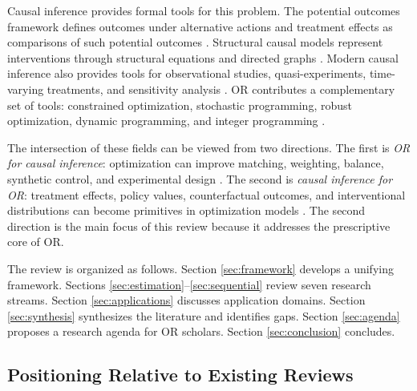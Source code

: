 \documentclass[11pt]{article}
\begin{document}
Causal inference provides formal tools for this problem. The potential outcomes framework defines outcomes under alternative actions and treatment effects as comparisons of such potential outcomes \citep{rubin1974estimating,holland1986statistics,imbens2015causal}. Structural causal models represent interventions through structural equations and directed graphs \citep{pearl2009causality}. Modern causal inference also provides tools for observational studies, quasi-experiments, time-varying treatments, and sensitivity analysis \citep{rosenbaum1983central,angrist2009mostly,rosenbaum2002observational,hernan2020causal}. OR contributes a complementary set of tools: constrained optimization, stochastic programming, robust optimization, dynamic programming, and integer programming \citep{bertsimas1997introduction,ben2009robust,bertsimas2011theory,iyengar2005robust}.

The intersection of these fields can be viewed from two directions. The first is \emph{OR for causal inference}: optimization can improve matching, weighting, balance, synthetic control, and experimental design \citep{abadie2010synthetic,hainmueller2012entropy,kallus2018balance,cousineau2023optimization}. The second is \emph{causal inference for OR}: treatment effects, policy values, counterfactual outcomes, and interventional distributions can become primitives in optimization models \citep{manski2004statistical,kitagawa2018treated,athey2021policy,bertsimas2020predictive,kallus2018confounding}. The second direction is the main focus of this review because it addresses the prescriptive core of OR.

The review is organized as follows. Section \ref{sec:framework} develops a unifying framework. Sections \ref{sec:estimation}--\ref{sec:sequential} review seven research streams. Section \ref{sec:applications} discusses application domains. Section \ref{sec:synthesis} synthesizes the literature and identifies gaps. Section \ref{sec:agenda} proposes a research agenda for OR scholars. Section \ref{sec:conclusion} concludes.

\subsection{Positioning Relative to Existing Reviews}
\end{document}
